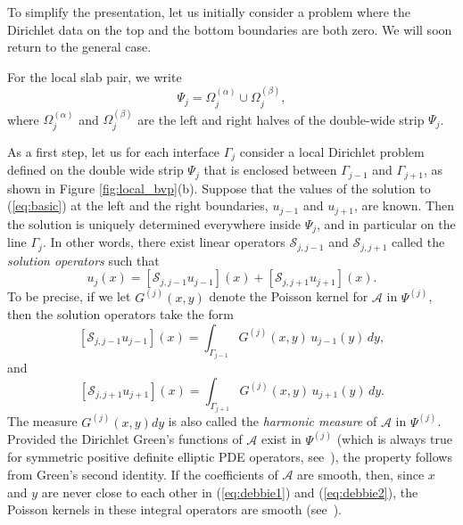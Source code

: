 \documentclass[final,onefignum,onetabnum]{siamart250211}
\theoremstyle{definition}
\begin{document}
To simplify the presentation, let us initially consider a problem where the Dirichlet
data on the top and the bottom boundaries are both zero. We will soon return to the
general case.

For the local slab pair, we write
\begin{equation}
\Psi_j = \Omega_j^{(\alpha)} \cup \Omega_j^{(\beta)},
\end{equation}
where $\Omega_j^{(\alpha)}$ and $\Omega_j^{(\beta)}$ are the left and right
halves of the double-wide strip $\Psi_j$.

As a first step, let us for each interface $\Gamma_{j}$ consider a local Dirichlet problem
defined on the double wide strip $\Psi_{j}$ that is enclosed between $\Gamma_{j-1}$ and
$\Gamma_{j+1}$, as shown in Figure \ref{fig:local_bvp}(b).
Suppose that the values of the solution to (\ref{eq:basic}) at the left and the
right boundaries, $u_{j-1}$ and $u_{j+1}$, are known.
Then the solution is uniquely determined everywhere inside $\Psi_{j}$, and in particular
on the line $\Gamma_{j}$.
In other words, there exist linear operators $\mathcal{S}_{j,j-1}$ and $\mathcal{S}_{j,j+1}$ called the \textit{solution operators} such that
$$
u_{j}(x) =
[\mathcal{S}_{j,j-1}u_{j-1}](x) +
[\mathcal{S}_{j,j+1}u_{j+1}](x).
$$
To be precise, if we let $G^{(j)}(x,y)$ denote the Poisson kernel for $\mathcal{A}$ in $\Psi^{(j)}$, then the solution operators take the form
\begin{equation}
\label{eq:debbie1}
[\mathcal{S}_{j,j-1}u_{j-1}](x) = \int_{\Gamma_{j-1}}G^{(j)}(x,y)\,u_{j-1}(y)\,dy,
\end{equation}
and
\begin{equation}
\label{eq:debbie2}
[\mathcal{S}_{j,j+1}u_{j+1}](x) = \int_{\Gamma_{j+1}}G^{(j)}(x,y)\,u_{j+1}(y)\,dy.
\end{equation}
The measure $G^{(j)}(x,y)dy$ is also called the \textit{harmonic measure} of $\mathcal{A}$ in $\Psi^{(j)}$. Provided the Dirichlet Green's functions of $\mathcal{A}$ exist in $\Psi^{(j)}$ (which is always true for symmetric positive definite elliptic PDE operators, see~\cite{DolzmannMuller1995}), the property follows from Green's second identity. If the coefficients of $\mathcal{A}$ are smooth, then, since $x$ and $y$ are never close to each other in (\ref{eq:debbie1}) and (\ref{eq:debbie2}), the Poisson kernels in these integral operators are smooth (see~\cite[Thm.~6.17]{gilbarg2001elliptic}).
\end{document}
